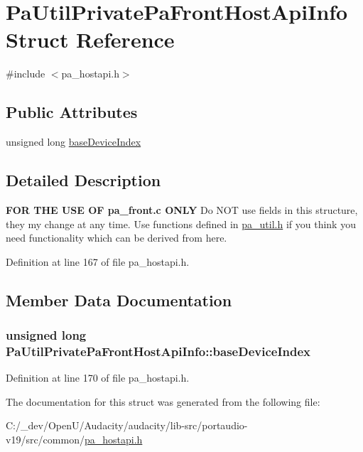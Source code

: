 \hypertarget{struct_pa_util_private_pa_front_host_api_info}{}\section{Pa\+Util\+Private\+Pa\+Front\+Host\+Api\+Info Struct Reference}
\label{struct_pa_util_private_pa_front_host_api_info}


{\ttfamily \#include $<$pa\+\_\+hostapi.\+h$>$}

\subsection*{Public Attributes}
\begin{DoxyCompactItemize}
\item 
unsigned long \hyperlink{struct_pa_util_private_pa_front_host_api_info_a5d7f8026ea1a9ada67d6f83906b4ba19}{base\+Device\+Index}
\end{DoxyCompactItemize}


\subsection{Detailed Description}
{\bfseries F\+OR T\+HE U\+SE OF pa\+\_\+front.\+c O\+N\+LY} Do N\+OT use fields in this structure, they my change at any time. Use functions defined in \hyperlink{pa__util_8h}{pa\+\_\+util.\+h} if you think you need functionality which can be derived from here. 

Definition at line 167 of file pa\+\_\+hostapi.\+h.



\subsection{Member Data Documentation}
\subsubsection[{\texorpdfstring{base\+Device\+Index}{baseDeviceIndex}}]{\setlength{\rightskip}{0pt plus 5cm}unsigned long Pa\+Util\+Private\+Pa\+Front\+Host\+Api\+Info\+::base\+Device\+Index}\hypertarget{struct_pa_util_private_pa_front_host_api_info_a5d7f8026ea1a9ada67d6f83906b4ba19}{}\label{struct_pa_util_private_pa_front_host_api_info_a5d7f8026ea1a9ada67d6f83906b4ba19}


Definition at line 170 of file pa\+\_\+hostapi.\+h.



The documentation for this struct was generated from the following file\+:\begin{DoxyCompactItemize}
\item 
C\+:/\+\_\+dev/\+Open\+U/\+Audacity/audacity/lib-\/src/portaudio-\/v19/src/common/\hyperlink{pa__hostapi_8h}{pa\+\_\+hostapi.\+h}\end{DoxyCompactItemize}
